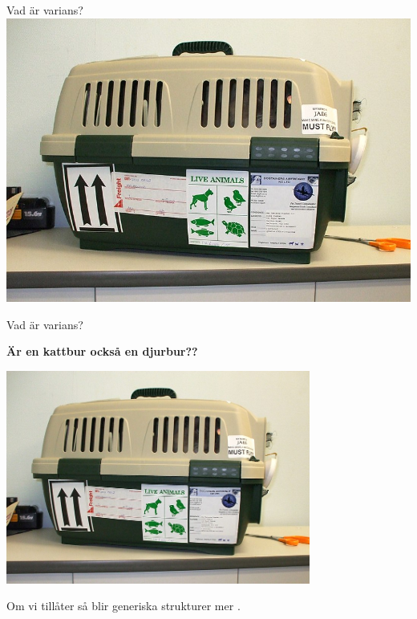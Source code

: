 
\ifkompendium\else
\begin{SlideSimple}{Vad är varians?}
\hspace*{-2cm}\includegraphics[width=1.4\textwidth]{../img/pet-carrier.jpg}  
\end{SlideSimple}
\fi 

\begin{Slide}{Vad är varians?}
\begin{center}
\textbf{Är en kattbur också en djurbur??}

\includegraphics[width=0.75\textwidth]{../img/pet-carrier.jpg}  

Om vi tillåter  så blir generiska strukturer mer .
\end{center}
\end{Slide}

